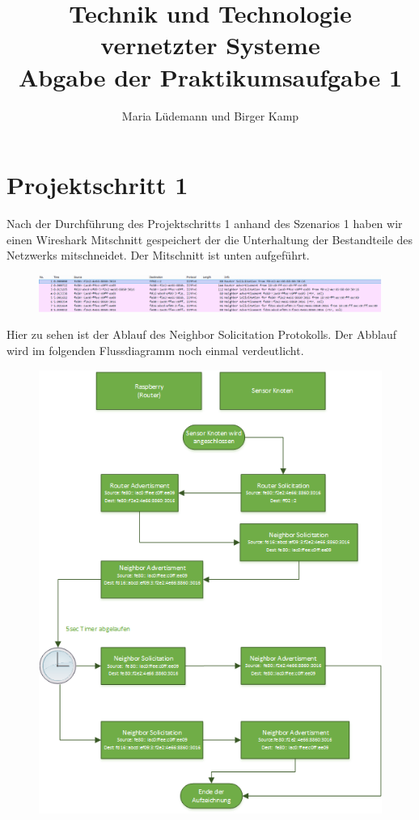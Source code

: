 \documentclass[]{scrartcl}
\title{Technik und Technologie vernetzter Systeme  \\ Abgabe der Praktikumsaufgabe 1}
\author{Maria Lüdemann und Birger Kamp}
\begin{document}
\maketitle

\section{Projektschritt 1}
Nach der Durchführung des Projektschritts 1 anhand des Szenarios 1 haben wir einen Wireshark Mitschnitt gespeichert der die Unterhaltung der Bestandteile des Netzwerks mitschneidet. Der Mitschnitt ist unten aufgeführt.

\begin{figure}[H]
	\centering
	\includegraphics[width=1\linewidth]{wireshark_1.png}
	\label{fig:wireshark_1}
\end{figure}

Hier zu sehen ist der Ablauf des Neighbor Solicitation Protokolls. Der Abblauf wird im folgenden Flussdiagramm noch einmal verdeutlicht. 


\begin{figure}[H]
	\centering
	\includegraphics[width=1\linewidth]{flussdiagramm.png}
	\label{fig:flussdiagramm}
\end{figure}
\end{document}
